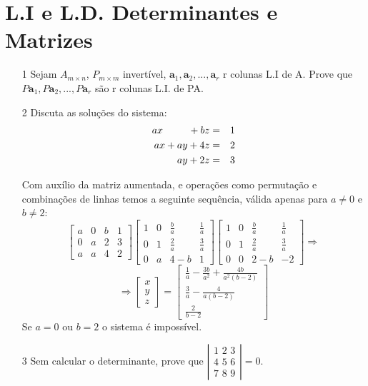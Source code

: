 \documentclass[a4paper]{article}
\begin{document}
\section*{L.I e L.D. Determinantes e Matrizes}

\begin{itemize}
\item[1] Sejam $A_{m \times n}$, $P_{m \times m}$ invertível, $\textbf{a}_1, \textbf{a}_2, ..., \textbf{a}_r$ r colunas L.I de A. Prove que $P\textbf{a}_1,P\textbf{a}_2,...,P\textbf{a}_r$ são r colunas L.I. de PA.

\item[2] Discuta as soluções do sistema:
\begin{eqnarray*} 
ax \hspace{9mm} +bz &=&1\\
ax+ay+4z&=&2\\
ay+2z&=&3 
\end{eqnarray*}

\textcolor[rgb]{0,0,1}{Com auxílio da matriz aumentada, e operações como permutação e combinações de linhas temos a seguinte sequência, válida apenas para $a\neq0$ e $b\neq2$:
$$
\begin{bmatrix}
a&0&b&1\\0&a&2&3\\a&a&4&2
\end{bmatrix}
\begin{bmatrix}
1&0&\frac{b}{a}&\frac{1}{a}\\0&1&\frac{2}{a}&\frac{3}{a}\\0&a&4-b&1
\end{bmatrix}
\begin{bmatrix}
1&0&\frac{b}{a}&\frac{1}{a}\\0&1&\frac{2}{a}&\frac{3}{a}\\0&0&2-b&-2
\end{bmatrix}
\Rightarrow
$$
$$
\Rightarrow
\begin{bmatrix}
x\\y\\z
\end{bmatrix}
=
\begin{bmatrix}
\frac{1}{a}-\frac{3b}{a^2} + \frac{4b}{a^2(b-2)}\\\frac{3}{a}-\frac{4}{a(b-2)}\\\frac{2}{b-2}
\end{bmatrix}
$$
Se $a=0$ ou $b=2$ o sistema é impossível.}

\item[3] Sem calcular o determinante, prove que 
$ \left \vert
\begin{array}{lll}
\displaystyle \text{1 2 3} \\
\displaystyle \text{4 5 6} \\
\displaystyle \text{7 8 9}
\end{array}
\right \vert = 0.
$


\end{itemize}
\end{document}
